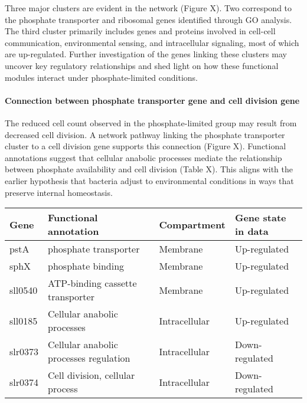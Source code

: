Three major clusters are evident in the network (Figure X). Two
correspond to the phosphate transporter and ribosomal genes identified
through GO analysis. The third cluster primarily includes genes and
proteins involved in cell-cell communication, environmental sensing, and
intracellular signaling, most of which are up-regulated. Further
investigation of the genes linking these clusters may uncover key
regulatory relationships and shed light on how these functional modules
interact under phosphate-limited conditions.

\paragraph{Connection between phosphate transporter gene and cell
division
gene}\label{connection-between-phosphate-transporter-gene-and-cell-division-gene}

The reduced cell count observed in the phosphate-limited group may
result from decreased cell division. A network pathway linking the
phosphate transporter cluster to a cell division gene supports this
connection (Figure X). Functional annotations suggest that cellular
anabolic processes mediate the relationship between phosphate
availability and cell division (Table X). This aligns with the earlier
hypothesis that bacteria adjust to environmental conditions in ways that
preserve internal homeostasis.

\begin{longtable}[]{@{}
  >{\raggedright\arraybackslash}p{}
  >{\raggedright\arraybackslash}p{}
  >{\raggedright\arraybackslash}p{}
  >{\raggedright\arraybackslash}p{}@{}}
\toprule\noalign{}
\begin{minipage}[b]{\linewidth}\raggedright
Gene
\end{minipage} & \begin{minipage}[b]{\linewidth}\raggedright
Functional annotation
\end{minipage} & \begin{minipage}[b]{\linewidth}\raggedright
Compartment
\end{minipage} & \begin{minipage}[b]{\linewidth}\raggedright
Gene state in data
\end{minipage} \\
\midrule\noalign{}
\endhead
\bottomrule\noalign{}
\endlastfoot
pstA & phosphate transporter & Membrane & Up-regulated \\
sphX & phosphate binding & Membrane & Up-regulated \\
sll0540 & ATP-binding cassette transporter & Membrane & Up-regulated \\
sll0185 & Cellular anabolic processes & Intracellular & Up-regulated \\
slr0373 & Cellular anabolic processes regulation & Intracellular &
Down-regulated \\
slr0374 & Cell division, cellular process & Intracellular &
Down-regulated \\
\end{longtable}

